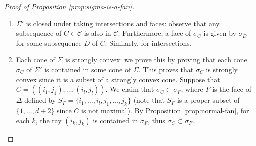 \documentclass[11pt, reqno]{amsart}
\theoremstyle{plain}
\theoremstyle{definition}
\begin{document}
\begin{proof}[Proof of Proposition \ref{prop:sigma-is-a-fan}]
\begin{enumerate}
\begin{enumerate}
    \end{enumerate}
    \item $\Sigma'$ is closed under taking intersections and faces: observe that any subsequence of $C \in \mathcal{C}$ is also in $\mathcal{C}$. Furthermore, a face of $\sigma_C$ is given by $\sigma_{D}$ for some subsequence $D$ of $C$. Similarly, for intersections.
    \item Each cone of $\Sigma$ is strongly convex: we prove this by proving that each cone $\sigma_C$ of $\Sigma'$ is contained in some cone of $\Sigma$. This proves that $\sigma_C$ is strongly convex since it is a subset of a strongly convex cone. Suppose that $C= ((i_1,j_1), \dots, (i_l,j_l))$. We claim that $\sigma_C \subset \sigma_F$, where $F$ is the face of $\Delta$ defined by $S_F= \{i_1,\dots,i_l,j_1, \dots,j_k\}$ (note that $S_F$ is a proper subset of $\{1,\dots,d+2\}$ since $C$ is not maximal). 
    By Proposition \ref{prop:normal-fan}, for each $k$, the ray $(i_k,j_k)$ is contained in $\sigma_F$, thus $\sigma_{C} \subset \sigma_{F}$.
\end{enumerate}
\end{proof}
\end{document}
